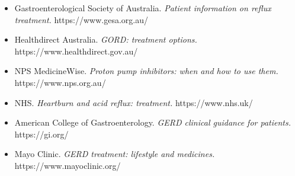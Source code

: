 \begin{itemize}
    \item Gastroenterological Society of Australia. \textit{Patient information on reflux treatment.} https://www.gesa.org.au/
    \item Healthdirect Australia. \textit{GORD: treatment options.} https://www.healthdirect.gov.au/
    \item NPS MedicineWise. \textit{Proton pump inhibitors: when and how to use them.} https://www.nps.org.au/
    \item NHS. \textit{Heartburn and acid reflux: treatment.} https://www.nhs.uk/
    \item American College of Gastroenterology. \textit{GERD clinical guidance for patients.} https://gi.org/
    \item Mayo Clinic. \textit{GERD treatment: lifestyle and medicines.} https://www.mayoclinic.org/
\end{itemize}
